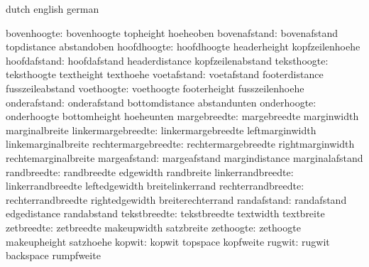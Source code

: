 
\startcommands                  dutch                        english
                                german


                  bovenhoogte:  bovenhoogte                  topheight
                                hoeheoben
                 bovenafstand:  bovenafstand                 topdistance
                                abstandoben
                  hoofdhoogte:  hoofdhoogte                  headerheight
                                kopfzeilenhoehe
                 hoofdafstand:  hoofdafstand                 headerdistance
                                kopfzeilenabstand
                  teksthoogte:  teksthoogte                  textheight
                                texthoehe
                  voetafstand:  voetafstand                  footerdistance
                                fusszeileabstand
                   voethoogte:  voethoogte                   footerheight
                                fusszeilenhoehe
                 onderafstand:  onderafstand                 bottomdistance
                                abstandunten
                  onderhoogte:  onderhoogte                  bottomheight
                                hoeheunten
                 margebreedte:  margebreedte                 marginwidth
                                marginalbreite
           linkermargebreedte:  linkermargebreedte           leftmarginwidth
                                linkemarginalbreite
          rechtermargebreedte:  rechtermargebreedte          rightmarginwidth
                                rechtemarginalbreite
                 margeafstand:  margeafstand                 margindistance
                                marginalafstand
                  randbreedte:  randbreedte                  edgewidth
                                randbreite
            linkerrandbreedte:  linkerrandbreedte            leftedgewidth
                                breitelinkerrand
           rechterrandbreedte:  rechterrandbreedte           rightedgewidth
                                breiterechterrand
                  randafstand:  randafstand                  edgedistance
                                randabstand
                 tekstbreedte:  tekstbreedte                 textwidth
                                textbreite
                   zetbreedte:  zetbreedte                   makeupwidth
                                satzbreite
                    zethoogte:  zethoogte                    makeupheight
                                satzhoehe
                       kopwit:  kopwit                       topspace
                                kopfweite
                       rugwit:  rugwit                       backspace
                                rumpfweite

